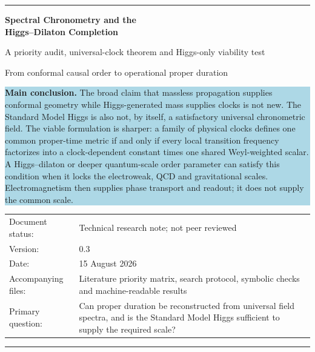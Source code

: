\documentclass[11pt,a4paper]{article}
\begin{document}

\begin{titlepage}
\thispagestyle{empty}
\vspace*{11mm}

{\color{navy}\rule{\textwidth}{1.2pt}}
\vspace{7mm}

{\fontsize{21}{25}\selectfont\bfseries\color{navy} Spectral Chronometry and the\\ Higgs--Dilaton Completion\par}
\vspace{3mm}
{\Large A priority audit, universal-clock theorem and Higgs-only viability test\par}
\vspace{2mm}
{\large From conformal causal order to operational proper duration\par}

\vspace{10mm}

\begin{center}
\begin{minipage}{0.92\textwidth}
\colorbox{lightblue}{\parbox{0.95\textwidth}{
\textbf{Main conclusion.} The broad claim that massless propagation supplies conformal geometry while Higgs-generated mass supplies clocks is not new. The Standard Model Higgs is also not, by itself, a satisfactory universal chronometric field. The viable formulation is sharper: a family of physical clocks defines one common proper-time metric if and only if every local transition frequency factorizes into a clock-dependent constant times one shared Weyl-weighted scalar. A Higgs--dilaton or deeper quantum-scale order parameter can satisfy this condition when it locks the electroweak, QCD and gravitational scales. Electromagnetism then supplies phase transport and readout; it does not supply the common scale.
}}
\end{minipage}
\end{center}

\vfill

\begin{tabularx}{\textwidth}{@{}p{}X@{}}
Document status: & Technical research note; not peer reviewed \\
Version: & 0.3 \\
Date: & 15 August 2026 \\
Accompanying files: & Literature priority matrix, search protocol, symbolic checks and machine-readable results \\
Primary question: & Can proper duration be reconstructed from universal field spectra, and is the Standard Model Higgs sufficient to supply the required scale?
\end{tabularx}

\vspace{8mm}
{\color{navy}\rule{\textwidth}{1.2pt}}
\end{titlepage}
\end{document}
